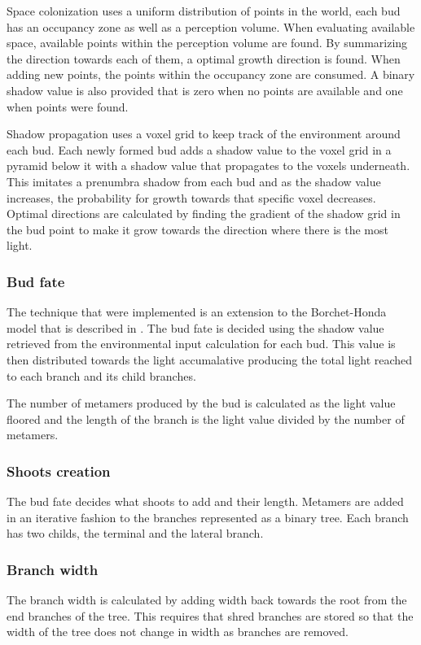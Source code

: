 \documentclass[11pt]{article} %
\begin{document}
Space colonization uses a uniform distribution of points in the world, each bud has an occupancy zone as well as a perception volume.
When evaluating available space, available points within the perception volume are found.
By summarizing the direction towards each of them, a optimal growth direction is found.
When adding new points, the points within the occupancy zone are consumed.
A binary shadow value is also provided that is zero when no points are available and one when points were found.

Shadow propagation uses a voxel grid to keep track of the environment around each bud.
Each newly formed bud adds a shadow value to the voxel grid in a pyramid below it with a shadow value that propagates to the voxels underneath.
This imitates a prenumbra shadow from each bud and as the shadow value increases, the probability for growth towards that specific voxel decreases.
Optimal directions are calculated by finding the gradient of the shadow grid in the bud point to make it grow towards the direction where there is the most light.

\subsubsection{Bud fate}
The technique that were implemented is an extension to the Borchet-Honda model that is described in \citet{Pablucki}.
The bud fate is decided using the shadow value retrieved from the environmental input calculation for each bud.
This value is then distributed towards the light accumalative producing the total light reached to each branch and its child branches.

The number of metamers produced by the bud is calculated as the light value floored and the length of the branch is the light value divided by the number of metamers.

\subsubsection{Shoots creation}
The bud fate decides what shoots to add and their length.
Metamers are added in an iterative fashion to the branches represented as a binary tree.
Each branch has two childs, the terminal and the lateral branch.

\subsubsection{Branch width}
The branch width is calculated by adding width back towards the root from the end branches of the tree.
This requires that shred branches are stored so that the width of the tree does not change in width as branches are removed.
\end{document}
